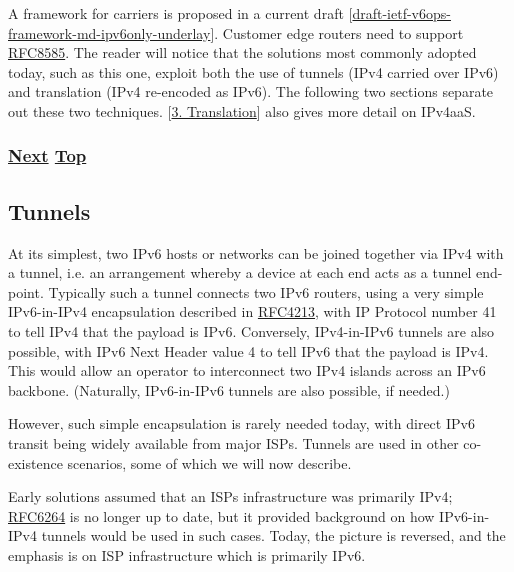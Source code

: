 \documentclass[
]{article}
\begin{document}
A framework for carriers is proposed in a current draft
{[}\href{https://datatracker.ietf.org/doc/draft-ietf-v6ops-framework-md-ipv6only-underlay/}{draft-ietf-v6ops-framework-md-ipv6only-underlay}{]}.
Customer edge routers need to support
\href{https://www.rfc-editor.org/info/rfc8585}{RFC8585}. The reader will
notice that the solutions most commonly adopted today, such as this one,
exploit both the use of tunnels (IPv4 carried over IPv6) and translation
(IPv4 re-encoded as IPv6). The following two sections separate out these
two techniques. {[}\hyperref[translation-and-ipv4-as-a-service]{3.
Translation}{]} also gives more detail on IPv4aaS.

\subsubsection{\texorpdfstring{\hyperref[tunnels]{Next}
\hyperref[coexistence-with-legacy-ipv4]{Top}}{Next Top}}\label{next-top-2}

\pagebreak

\subsection{Tunnels}\label{tunnels}

At its simplest, two IPv6 hosts or networks can be joined together via
IPv4 with a tunnel, i.e. an arrangement whereby a device at each end
acts as a tunnel end-point. Typically such a tunnel connects two IPv6
routers, using a very simple IPv6-in-IPv4 encapsulation described in
\href{https://www.rfc-editor.org/info/rfc4213}{RFC4213}, with IP
Protocol number 41 to tell IPv4 that the payload is IPv6. Conversely,
IPv4-in-IPv6 tunnels are also possible, with IPv6 Next Header value 4 to
tell IPv6 that the payload is IPv4. This would allow an operator to
interconnect two IPv4 islands across an IPv6 backbone. (Naturally,
IPv6-in-IPv6 tunnels are also possible, if needed.)

However, such simple encapsulation is rarely needed today, with direct
IPv6 transit being widely available from major ISPs. Tunnels are used in
other co-existence scenarios, some of which we will now describe.

Early solutions assumed that an ISP\textquotesingle s infrastructure was
primarily IPv4; \href{https://www.rfc-editor.org/info/rfc6264}{RFC6264}
is no longer up to date, but it provided background on how IPv6-in-IPv4
tunnels would be used in such cases. Today, the picture is reversed, and
the emphasis is on ISP infrastructure which is primarily IPv6.
\end{document}
